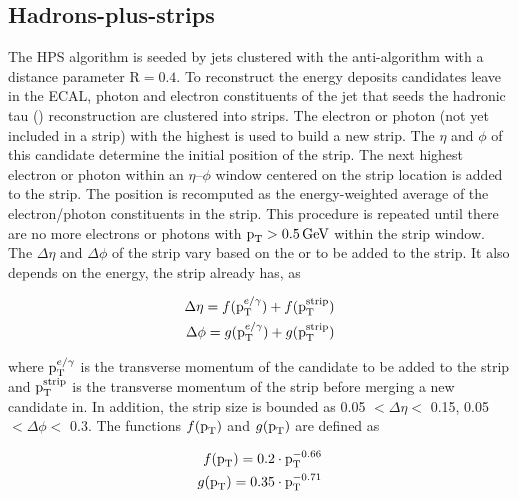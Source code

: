 \subsection{Hadrons-plus-strips}

The HPS algorithm is seeded by jets clustered with the anti-\kt algorithm with a distance parameter $\mathrm{R} = 0.4$. To reconstruct the energy deposits \Pgpz candidates leave in the ECAL, photon and electron constituents of the jet that seeds the hadronic tau (\tauh) reconstruction are clustered into strips. The electron or photon (not yet included in a strip) with the highest \pt is used to build a new strip. The $\eta$ and $\phi$ of this candidate determine the initial position of the strip. The next highest \pt electron or photon within an $\eta$--$\phi$ window centered on the strip location is added to the strip. The position is recomputed as the energy-weighted average of the electron/photon constituents in the strip. This procedure is repeated until there are no more electrons or photons with $\text{p}_\text{T} > 0.5 \,\text{Ge\hspace{-.08em}V}$ within the strip window. The $\Delta \eta $ and $\Delta \phi $ of the strip vary based on the \pt or \ET to be added to the strip. It also depends on the energy, the strip already has, as
\begin{linenomath*}
  \begin{equation*}
    \begin{aligned}
      \Delta \eta = f(\text{p}_\text{T}^{e/\gamma}) + f(\text{p}_\text{T}^{\text{strip}}) \\
      \Delta \phi = g(\text{p}_\text{T}^{e/\gamma}) + g(\text{p}_\text{T}^{\text{strip}})
    \end{aligned}
  \end{equation*}
\end{linenomath*}
where $\text{p}_\text{T}^{e/\gamma}$ is the transverse momentum of the candidate to be added to the strip and $\text{p}_\text{T}^{\text{strip}}$ is the transverse momentum of the strip before merging a new candidate in. In addition, the strip size is bounded as 0.05 $< \Delta\eta <$ 0.15, 0.05 $< \Delta\phi <$ 0.3. The functions $f(\text{p}_\text{T})$ and $g(\text{p}_\text{T})$ are defined as
\begin{linenomath*}
  \begin{equation*}
    \begin{aligned}
      f(\text{p}_\text{T}) = 0.2 \cdot \text{p}_\text{T}^{-0.66} \\
      g(\text{p}_\text{T}) = 0.35 \cdot \text{p}_\text{T}^{-0.71}
    \end{aligned}
  \end{equation*}
\end{linenomath*}

